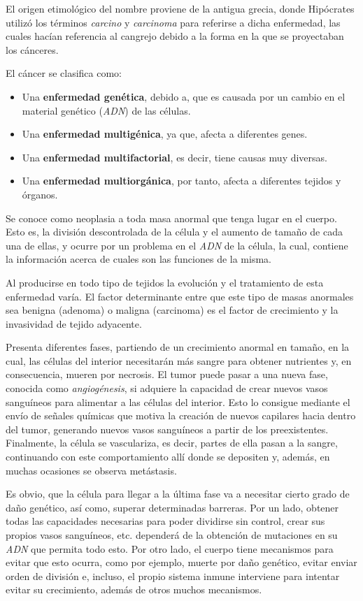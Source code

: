 El origen etimológico del nombre proviene de la antigua grecia, donde
Hipócrates utilizó los términos \textit{carcino} y \textit{carcinoma} para referirse
a dicha enfermedad, las cuales hacían referencia al cangrejo debido a la forma en la
que se proyectaban los cánceres.

El cáncer se clasifica como:

\begin{itemize}
    \item Una \textbf{enfermedad genética}, debido a, que es causada por un cambio en el
    material genético (\textit{ADN}) de las células.
    \item Una \textbf{enfermedad multigénica}, ya que, afecta a diferentes genes.
    \item Una \textbf{enfermedad multifactorial}, es decir, tiene causas muy diversas.
    \item Una \textbf{enfermedad multiorgánica}, por tanto, afecta a diferentes tejidos y órganos.
\end{itemize}

Se conoce como neoplasia a toda masa anormal que tenga lugar en el cuerpo. Esto es, la división
descontrolada de la célula y el aumento de tamaño de cada una de ellas, y ocurre
por un problema en el \textit{ADN} de la célula, la cual, contiene la información acerca de cuales son
las funciones de la misma.

Al producirse en todo tipo de tejidos la evolución y el tratamiento de esta enfermedad varía.
El factor determinante entre que este tipo de masas anormales sea benigna (adenoma)
o maligna (carcinoma) es el factor de crecimiento y la invasividad de tejido adyacente.

Presenta diferentes fases, partiendo de un crecimiento anormal en tamaño, en la cual,
las células del interior necesitarán más sangre para obtener nutrientes y, en consecuencia,
mueren por necrosis. El tumor puede pasar a una nueva fase, conocida como \textit{angiogénesis},
si adquiere la capacidad de crear nuevos vasos sanguíneos para alimentar a las células
del interior. Esto lo consigue mediante el envío de señales químicas que motiva la creación
de nuevos capilares hacia dentro del tumor, generando nuevos vasos sanguíneos a partir de
los preexistentes. Finalmente, la célula se vasculariza, es decir, partes de ella pasan
a la sangre, continuando con este comportamiento allí donde se depositen y, además, en muchas
ocasiones se observa metástasis.

Es obvio, que la célula para llegar a la última fase va a necesitar cierto grado de daño genético,
así como, superar determinadas barreras. Por un lado, obtener todas las capacidades necesarias para
poder dividirse sin control, crear sus propios vasos sanguíneos, etc. dependerá de la obtención
de mutaciones en su \textit{ADN} que permita todo esto. Por otro lado, el cuerpo tiene mecanismos para evitar
que esto ocurra, como por ejemplo, muerte por daño genético, evitar enviar orden de división e, incluso,
el propio sistema inmune interviene para intentar evitar su crecimiento, además de otros muchos mecanismos.

